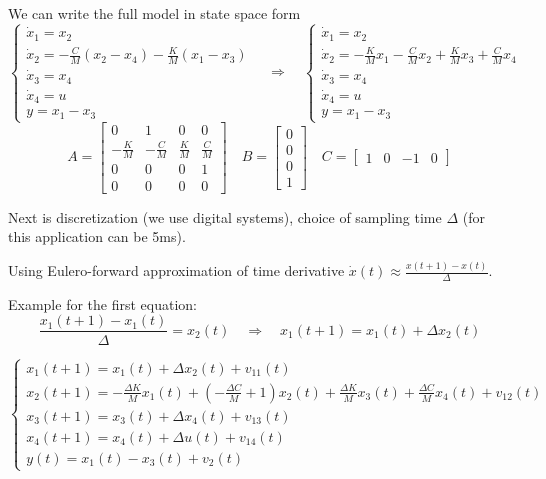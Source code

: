 \begin{exercise}
    We can write the full model in state space form
    \[
        \begin{cases}
            \dot{x}_1 = x_2 \\
            \dot{x}_2 = -\frac{C}{M} (x_2-x_4) - \frac{K}{M}(x_1-x_3) \\
            \dot{x}_3 = x_4 \\
            \dot{x}_4 = u \\
            y = x_1-x_3
        \end{cases}
        \quad\Rightarrow\quad
        \begin{cases}
            \dot{x}_1 = x_2 \\
            \dot{x}_2 = -\frac{K}{M}x_1 - \frac{C}{M}x_2 + \frac{K}{M}x_3 + \frac{C}{M} x_4 \\
            \dot{x}_3 = x_4 \\
            \dot{x}_4 = u \\
            y = x_1-x_3
        \end{cases}
    \]
    \[
        A = \begin{bmatrix}
            0 & 1 & 0 & 0 \\
            -\frac{K}{M} & -\frac{C}{M} & \frac{K}{M} & \frac{C}{M} \\
            0 & 0 & 0 & 1 \\
            0 & 0 & 0 & 0
        \end{bmatrix}
        \quad
        B = \begin{bmatrix}
            0 \\ 0 \\ 0 \\ 1
        \end{bmatrix}
        \quad
        C = \begin{bmatrix}
            1 & 0 & -1 & 0
        \end{bmatrix}
    \]

    Next is discretization (we use digital systems), choice of sampling time $\Delta$ (for this application can be 5ms).

    Using Eulero-forward approximation of time derivative $\dot{x}(t) \approx \frac{x(t+1)-x(t)}{\Delta}$.

    Example for the first equation:
    \[
        \frac{x_1(t+1)-x_1(t)}{\Delta} = x_2(t) \quad\Rightarrow\quad x_1(t+1) = x_1(t) + \Delta x_2(t)
    \]

    \[
        \begin{cases}
            x_1(t+1) = x_1(t) + \Delta x_2(t) + v_{11}(t) \\
            x_2(t+1) = -\frac{\Delta K}{M} x_1(t) + \left( -\frac{\Delta C}{M} + 1 \right)x_2(t) + \frac{\Delta K}{M} x_3(t) + \frac{\Delta C}{M} x_4(t) + v_{12}(t) \\
            x_3(t+1) = x_3(t) + \Delta x_4(t) + v_{13}(t) \\
            x_4(t+1) = x_4(t) + \Delta u(t) + v_{14}(t) \\
            y(t) = x_1(t) - x_3(t) + v_2(t)
        \end{cases}
    \]


\end{exercise}
